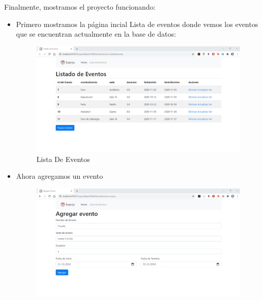 \documentclass[10pt,a4paper]{article}
\begin{document}
\hfill \break



\pagebreak


\section{\color{colorIPN}{Resultados}}
Finalmente, mostramos el proyecto funcionando:
\begin{itemize}
    \item Primero mostramos la página incial Lista de eventos donde vemos los eventos que se encuentran actualmente en la base de datos:
        \begin{figure}[H]
    	\includegraphics[scale=0.5]{images/listaDeEventos.png}
    	\centering \linebreak \linebreak 
    	\caption{Lista De Eventos}
    	\label{img:List}
    \end{figure}  \hfill
    \item Ahora agregamos un evento
        \begin{figure}[H]
    	\includegraphics[scale=0.5]{images/agregarEvento.png}

\end{figure}
\end{itemize}
\end{document}
